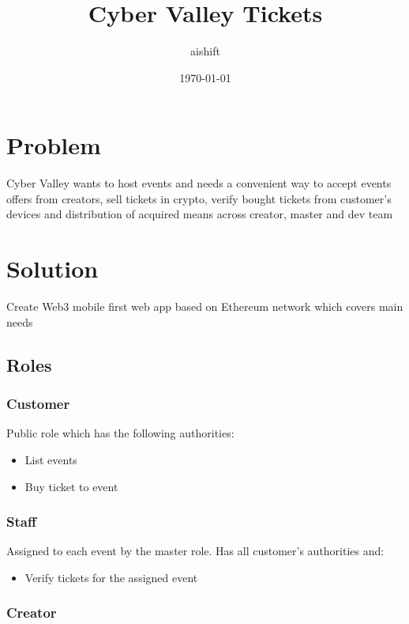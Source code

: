 \documentclass[11pt]{article}
\author{aishift}
\date{\today}
\title{Cyber Valley Tickets}
\begin{document}
\maketitle
\tableofcontents

\section{Problem}
\label{sec:org3e3534f}

Cyber Valley wants to host events and needs a convenient way to accept events offers from creators, sell tickets in crypto, verify bought tickets from customer's devices and distribution of acquired means across creator, master and dev team
\section{Solution}
\label{sec:org00aae75}

Create Web3 mobile first web app based on Ethereum network which covers main needs
\subsection{Roles}
\label{sec:org73cfe6f}

\subsubsection{Customer}
\label{sec:orge309627}

Public role which has the following authorities:

\begin{itemize}
\item List events
\item Buy ticket to event
\end{itemize}
\subsubsection{Staff}
\label{sec:org2a8c829}

Assigned to each event by the master role. Has all customer's authorities and:

\begin{itemize}
\item Verify tickets for the assigned event
\end{itemize}
\subsubsection{Creator}
\label{sec:orge217395}
\end{document}
